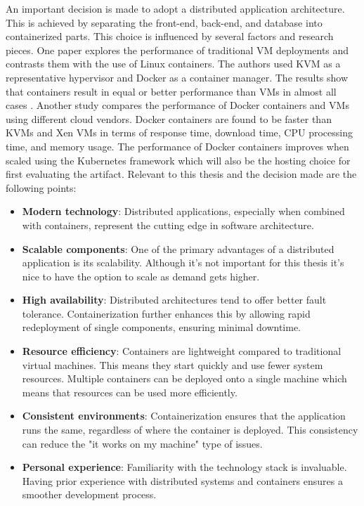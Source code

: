 An important decision is made to adopt a distributed application 
architecture. This is achieved by separating the front-end, back-end, and database into containerized parts. 
This choice is influenced by several factors and research pieces. 
One paper explores the performance of traditional VM deployments and 
contrasts them with the use of Linux containers. 
The authors used KVM as a representative hypervisor and Docker as a container manager. 
The results show that containers result in equal or better 
performance than VMs in almost all cases \parencite{felter2015updated}. 
Another study compares the performance of Docker containers and VMs using 
different cloud vendors. 
Docker containers are found to be faster than KVMs and Xen VMs in terms of response time, 
download time, CPU processing time, and memory usage. 
The performance of Docker containers improves when scaled using the 
Kubernetes framework \parencite{chengeta2021comparing} which will also be 
the hosting choice for first evaluating the artifact. 
Relevant to this thesis and the decision made are the following points:

\begin{itemize}
    \item \textbf{Modern technology}: Distributed applications, especially when combined with containers, represent the cutting edge in software architecture. 
    \item \textbf{Scalable components}: One of the primary advantages of a distributed application is its scalability. Although it's not important for this thesis it's nice to have the option to scale as demand gets higher.
    \item \textbf{High availability}: Distributed architectures tend to offer better fault tolerance. Containerization further enhances this by allowing rapid redeployment of single components, ensuring minimal downtime.
    \item \textbf{Resource efficiency}: Containers are lightweight compared to traditional virtual machines. This means they start quickly and use fewer system resources. Multiple containers can be deployed onto a single machine which means that resources can be used more efficiently.
    \item \textbf{Consistent environments}: Containerization ensures that the application runs the same, regardless of where the container is deployed. This consistency can reduce the "it works on my machine" type of issues. 
    \item \textbf{Personal experience}: Familiarity with the technology stack is invaluable. Having prior experience with distributed systems and containers ensures a smoother development process.
\end{itemize}

